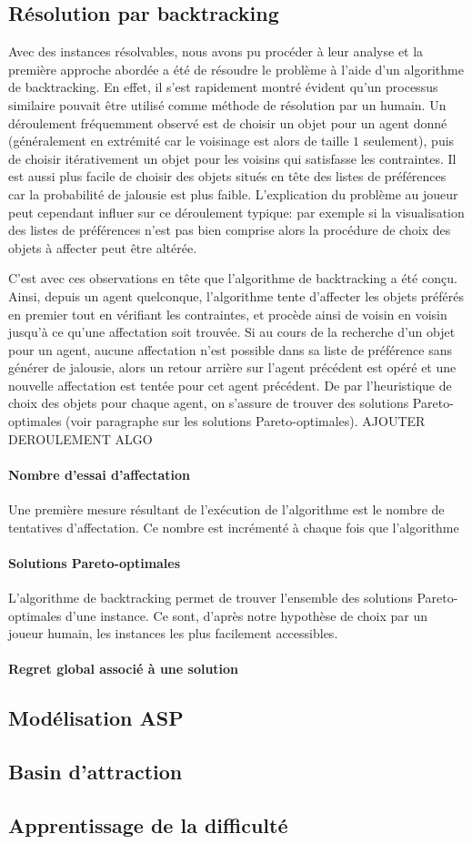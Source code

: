 \documentclass[a4paper, 10pt]{article}
\begin{document}
	\subsection{Résolution par backtracking}
	Avec des instances résolvables, nous avons pu procéder à leur analyse et la première approche abordée a été de résoudre le problème à l'aide d'un algorithme de backtracking. En effet, il s'est rapidement montré évident qu'un processus similaire pouvait être utilisé comme méthode de résolution par un humain. Un déroulement fréquemment observé est de choisir un objet pour un agent donné (généralement en extrémité car le voisinage est alors de taille $1$ seulement), puis de choisir itérativement un objet pour les voisins qui satisfasse les contraintes. Il est aussi plus facile de choisir des objets situés en tête des listes de préférences car la probabilité de jalousie est plus faible. L'explication du problème au joueur peut cependant influer sur ce déroulement typique: par exemple si la visualisation des listes de préférences n'est pas bien comprise alors la procédure de choix des objets à affecter peut être altérée.
	
	C'est avec ces observations en tête que l'algorithme de backtracking a été conçu. Ainsi, depuis un agent quelconque, l'algorithme tente d'affecter les objets préférés en premier tout en vérifiant les contraintes, et procède ainsi de voisin en voisin jusqu'à ce qu'une affectation soit trouvée. Si au cours de la recherche d'un objet pour un agent, aucune affectation n'est possible dans sa liste de préférence sans générer de jalousie, alors un retour arrière sur l'agent précédent est opéré et une nouvelle affectation est tentée pour cet agent précédent. De par l'heuristique de choix des objets pour chaque agent, on s'assure de trouver des solutions Pareto-optimales (voir paragraphe sur les solutions Pareto-optimales). AJOUTER DEROULEMENT ALGO
	
	\paragraph{Nombre d'essai d'affectation}{Une première mesure résultant de l'exécution de l'algorithme est le nombre de tentatives d'affectation. Ce nombre est incrémenté à chaque fois que l'algorithme }
	\paragraph{Solutions Pareto-optimales}{L'algorithme de backtracking permet de trouver l'ensemble des solutions Pareto-optimales d'une instance. Ce sont, d'après notre hypothèse de choix par un joueur humain, les instances les plus facilement accessibles.}
	
	\paragraph{Regret global associé à une solution}
	\subsection{Modélisation ASP}
	
	\subsection{Basin d'attraction}
	\subsection{Apprentissage de la difficulté}
	
\end{document}
